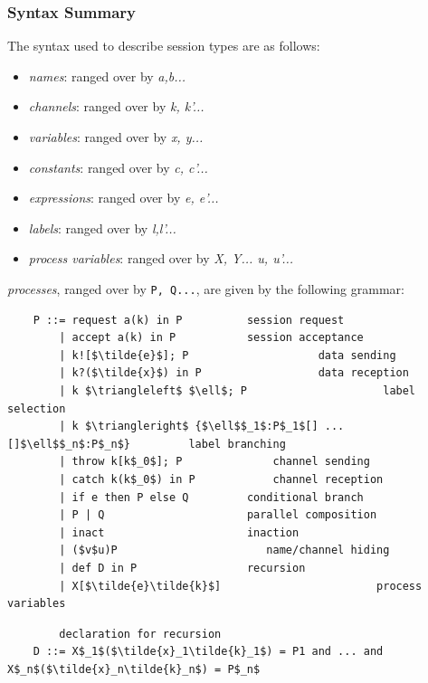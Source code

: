 \documentclass[11pt]{scrartcl}
\begin{document}
\subsubsection{Syntax Summary}

The syntax used to describe session types are as follows:

\begin{itemize}
	\item \emph{names}: ranged over by \emph{a,b...}
	\item \emph{channels}: ranged over by \emph{k, k'...}
	\item \emph{variables}: ranged over by \emph{x, y...}
	\item \emph{constants}: ranged over by \emph{c, c'...}
	\item \emph{expressions}: ranged over by \emph{e, e'...}
	\item \emph{labels}: ranged over by \emph{l,l'...}
	\item \emph{process variables}: ranged over by \emph{X, Y... u, u'...}
\end{itemize}

\emph{processes}, ranged over by \texttt{P, Q...}, are given by the following 
grammar:
\\

\begin{lstlisting}
    P ::= request a(k) in P          session request
        | accept a(k) in P           session acceptance
        | k![$\tilde{e}$]; P                    data sending
        | k?($\tilde{x}$) in P                  data reception
        | k $\triangleleft$ $\ell$; P                     label selection
        | k $\triangleright$ {$\ell$$_1$:P$_1$[] ... []$\ell$$_n$:P$_n$}         label branching
        | throw k[k$_0$]; P              channel sending
        | catch k(k$_0$) in P            channel reception
        | if e then P else Q         conditional branch
        | P | Q                      parallel composition
        | inact                      inaction
        | ($v$u)P                       name/channel hiding
        | def D in P                 recursion
        | X[$\tilde{e}\tilde{k}$]                        process variables
\end{lstlisting}
\begin{lstlisting}
        declaration for recursion
    D ::= X$_1$($\tilde{x}_1\tilde{k}_1$) = P1 and ... and X$_n$($\tilde{x}_n\tilde{k}_n$) = P$_n$ 
\end{lstlisting}
\end{document}
